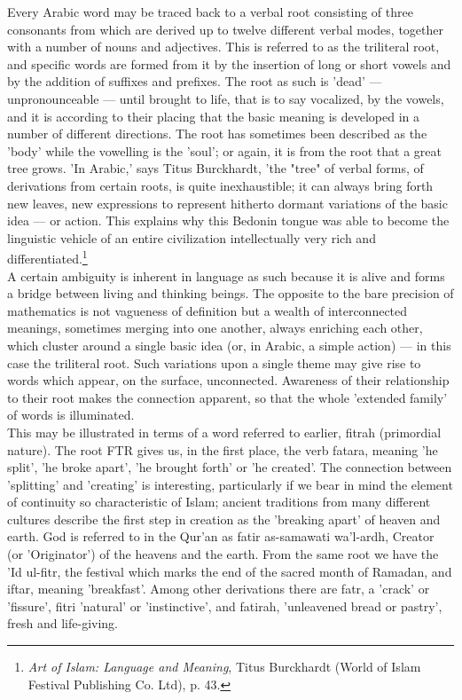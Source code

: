 \documentclass[11pt, b5paper, twoside]{book}
\begin{document}
Every Arabic word may be traced back to a verbal root consisting of three consonants from which are 
derived up to twelve different verbal modes, together with a number of nouns and adjectives. This is 
referred to as the triliteral root, and specific words are formed from it by the insertion of long or 
short vowels and by the addition of suffixes and prefixes. The root as such is 'dead' --- 
unpronounceable --- until brought to life, that is to say vocalized, by the vowels, and it is according 
to their placing that the basic meaning is developed in a number of different directions. The root 
has sometimes been described as the 'body' while the vowelling is the 'soul'; or again, it is from 
the root that a great tree grows. 'In Arabic,' says Titus Burckhardt, 'the "tree" of verbal forms, of 
derivations from certain roots, is quite inexhaustible; it can always bring forth new leaves, new 
expressions to represent hitherto dormant variations of the basic idea --- or action. This explains why 
this Bedonin tongue was able to become the linguistic vehicle of an entire civilization 
intellectually very rich and differentiated.\footnote{\emph{Art of Islam: Language and Meaning}, Titus Burckhardt (World of Islam Festival Publishing Co. Ltd), p. 43.}\\

A certain ambiguity is inherent in language as such because it is alive and forms a bridge between 
living and thinking beings. The opposite to the bare precision of mathematics is not vagueness of 
definition but a wealth of interconnected meanings, sometimes merging into one another, always 
enriching each other, which cluster around a single basic idea (or, in Arabic, a simple action) --- in 
this case the triliteral root. Such variations upon a single theme may give rise to words which 
appear, on the surface, unconnected. Awareness of their relationship to their root makes the 
connection apparent, so that the whole 'extended family' of words is illuminated. \\

This may be illustrated in terms of a word referred to earlier, fitrah (primordial nature). The root 
FTR gives us, in the first place, the verb fatara, meaning 'he split', 'he broke apart', 'he brought 
forth' or 'he created'. The connection between 'splitting' and 'creating' is interesting, 
particularly if we bear in mind the element of continuity so characteristic of Islam; ancient 
traditions from many different cultures describe the first step in creation as the 'breaking apart' 
of heaven and earth. God is referred to in the Qur'an as fatir as-samawati wa'l-ardh, Creator (or 
'Originator') of the heavens and the earth. From the same root we have the 'Id ul-fitr, the festival 
which marks the end of the sacred month of Ramadan, and iftar, meaning 'breakfast'. Among other 
derivations there are fatr, a 'crack' or 'fissure', fitri 'natural' or 'instinctive', and fatirah, 
'unleavened bread or pastry', fresh and life-giving. \\
\end{document}
